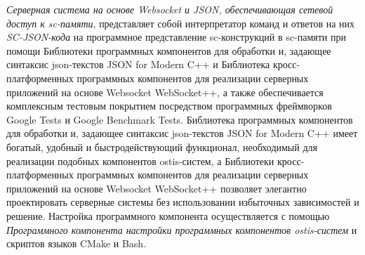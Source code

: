\textit{Серверная система на основе Websocket и JSON, обеспечивающая сетевой доступ к sc-памяти}, представляет собой
интерпретатор команд и ответов на них \textit{SC-JSON-кода} на программное представление sc-конструкций в sc-памяти при
помощи Библиотеки программных компонентов для обработки и, задающее синтаксис json-текстов JSON for Modern C++ и
Библиотека кросс-платформенных программных компонентов для реализации серверных приложений на основе Websocket WebSocket++,
а также обеспечивается комплексным тестовым покрытием посредством программных фреймворков Google Tests и Google Benchmark Tests.
Библиотека программных компонентов для обработки и, задающее синтаксис json-текстов JSON for Modern C++ имеет богатый,
удобный и быстродействующий функционал, необходимый для реализации подобных компонентов ostis-систем, а Библиотеки
кросс-платформенных программных компонентов для реализации серверных приложений на основе Websocket WebSocket++
позволяет элегантно проектировать серверные системы без использовании избыточных зависимостей и решение. Настройка
программного компонента осуществляется с помощью \textit{Программного компонента настройки программных компонентов
ostis-систем} и скриптов языков CMake и Bash.

